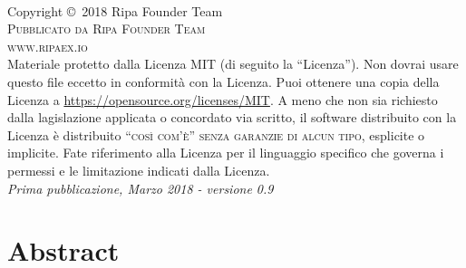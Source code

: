 \documentclass[11pt,fleqn]{book} %
\begin{document}
\begingroup
\thispagestyle{empty}
\endgroup

\newpage
~\vfill
\thispagestyle{empty}

\noindent Copyright \copyright\ 2018 Ripa Founder Team\\ %

\noindent \textsc{Pubblicato da Ripa Founder Team}\\ %

\noindent \textsc{www.ripaex.io}\\ %

\noindent Materiale protetto dalla Licenza MIT (di seguito la ``Licenza''). Non dovrai usare questo file eccetto in conformità con la Licenza. Puoi ottenere una copia della Licenza a \url{https://opensource.org/licenses/MIT}. A meno che non sia richiesto dalla lagislazione applicata o concordato via scritto, il software distribuito con la Licenza è distribuito \textsc{``così com'è'' senza garanzie di alcun tipo}, esplicite o implicite. Fate riferimento alla Licenza per il linguaggio specifico che governa i permessi e le limitazione indicati dalla Licenza.\\ 

\noindent \textit{Prima pubblicazione, Marzo 2018 - versione 0.9} %

\pagestyle{empty} %
\usechapterimagefalse %
\chapter{Abstract}
\end{document}
